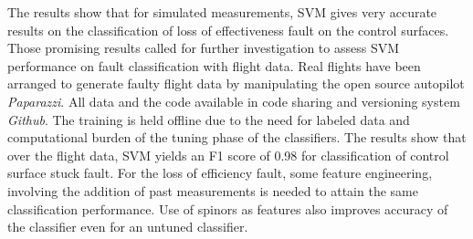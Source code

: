 The results show that for simulated measurements, SVM gives very accurate results on the classification of loss of effectiveness fault on the control surfaces. 
Those promising results called for further investigation to assess SVM performance on fault classification with flight data.
Real flights have been arranged to generate faulty flight data by manipulating the open source autopilot \emph{Paparazzi}. 
All data and the code available in code sharing and versioning system \emph{Github}. 
The training is held offline due to the need for labeled data and computational burden of the tuning phase of the classifiers. 
The results show that over the flight data, SVM yields an F1 score of 0.98 for classification of control surface stuck fault. 
For the loss of efficiency fault, some feature engineering, involving the addition of past measurements is needed to attain the same classification performance. 
Use of spinors as features also improves accuracy of the classifier even for an untuned classifier.